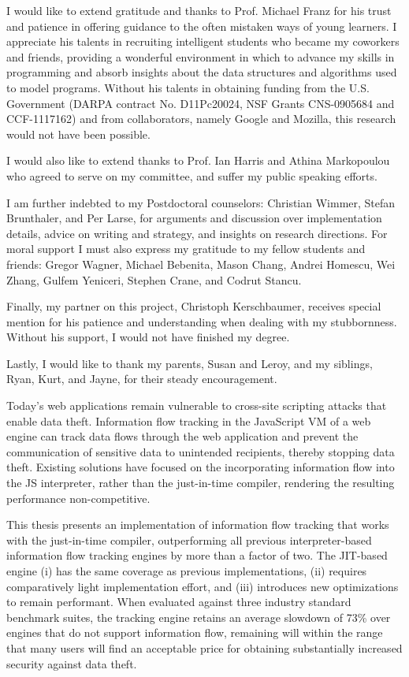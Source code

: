 \documentclass[12pt,fleqn]{ucithesis}
\begin{document}
\acknowledgments
{
  I would like to extend gratitude and thanks to Prof. Michael Franz for his trust and patience in offering guidance to the often mistaken ways of young learners.
  I appreciate his talents in recruiting intelligent students who became my coworkers and friends, providing a wonderful environment in which to advance my skills in programming and absorb insights about the data structures and algorithms used to model programs.
  Without his talents in obtaining funding from the U.S. Government (DARPA contract No. D11Pc20024, NSF Grants CNS-0905684 and CCF-1117162) and from collaborators, namely Google and Mozilla, this research would not have been possible.

  I would also like to extend thanks to Prof. Ian Harris and Athina Markopoulou who agreed to serve on my committee, and suffer my public speaking efforts.

  I am further indebted to my Postdoctoral counselors: Christian Wimmer, Stefan Brunthaler, and Per Larse, for arguments and discussion over implementation details, advice on writing and strategy, and insights on research directions. For moral support I must also express my gratitude to my fellow students and friends: Gregor Wagner, Michael Bebenita, Mason Chang, Andrei Homescu, Wei Zhang, Gulfem Yeniceri, Stephen Crane, and Codrut Stancu.

  Finally, my partner on this project, Christoph Kerschbaumer, receives special mention for his patience and understanding when dealing with my stubbornness.
  Without his support, I would not have finished my degree.

  Lastly, I would like to thank my parents, Susan and Leroy, and my siblings, Ryan, Kurt, and Jayne, for their steady encouragement.
}



\thesisabstract
{
Today's web applications remain vulnerable to cross-site scripting attacks that enable data theft.
Information flow tracking in the JavaScript VM of a web engine can track data flows through the web application and prevent the communication of sensitive data to unintended recipients, thereby stopping data theft.
Existing solutions have focused on the incorporating information flow into the JS interpreter, rather than the just-in-time compiler, rendering the resulting performance non-competitive.

This thesis presents an implementation of information flow tracking that works with the just-in-time compiler, outperforming all previous interpreter-based information flow tracking engines by more than a factor of two.
The JIT-based engine (i) has the same coverage as previous implementations,
(ii) requires comparatively light implementation effort,
and (iii) introduces new optimizations to remain performant.
When evaluated against three industry standard benchmark suites, the tracking engine retains an average slowdown of 73\% over engines that do not support information flow, remaining will within the range that many users will find an acceptable price for obtaining substantially increased security against data theft.
}
\end{document}

